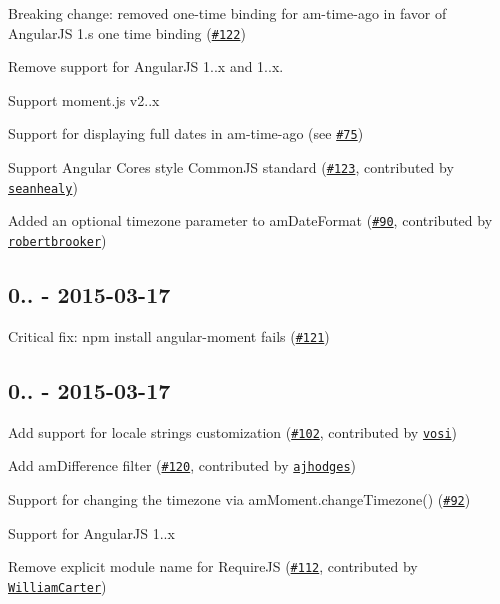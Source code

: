 \begin{DoxyItemize}
\item Breaking change\+: removed one-\/time binding for {\ttfamily am-\/time-\/ago} in favor of Angular\+JS 1.\textquotesingle{}s one time binding (\href{https://github.com/urish/angular-moment/issues/122}{\tt \#122})
\item Remove support for Angular\+JS 1..\+x and 1..\+x.
\item Support moment.\+js v2..\+x
\item Support for displaying full dates in {\ttfamily am-\/time-\/ago} (see \href{https://github.com/urish/angular-moment/issues/75}{\tt \#75})
\item Support Angular Core\textquotesingle{}s style Common\+JS standard (\href{https://github.com/urish/angular-moment/pull/123}{\tt \#123}, contributed by \href{https://github.com/seanhealy}{\tt seanhealy})
\item Added an optional timezone parameter to am\+Date\+Format (\href{https://github.com/urish/angular-moment/pull/90}{\tt \#90}, contributed by \href{https://github.com/robertbrooker}{\tt robertbrooker})
\end{DoxyItemize}

\subsection*{0.. -\/ 2015-\/03-\/17}


\begin{DoxyItemize}
\item Critical fix\+: npm install angular-\/moment fails (\href{https://github.com/urish/angular-moment/issues/121}{\tt \#121})
\end{DoxyItemize}

\subsection*{0.. -\/ 2015-\/03-\/17}


\begin{DoxyItemize}
\item Add support for locale strings customization (\href{https://github.com/urish/angular-moment/pull/102}{\tt \#102}, contributed by \href{https://github.com/vosi}{\tt vosi})
\item Add {\ttfamily am\+Difference} filter (\href{https://github.com/urish/angular-moment/pull/120}{\tt \#120}, contributed by \href{https://github.com/ajhodges}{\tt ajhodges})
\item Support for changing the timezone via {\ttfamily am\+Moment.\+change\+Timezone()} (\href{https://github.com/urish/angular-moment/issues/92}{\tt \#92})
\item Support for Angular\+JS 1..\+x
\item Remove explicit module name for Require\+JS (\href{https://github.com/urish/angular-moment/pull/112}{\tt \#112}, contributed by \href{https://github.com/WilliamCarter}{\tt William\+Carter})
\end{DoxyItemize}

